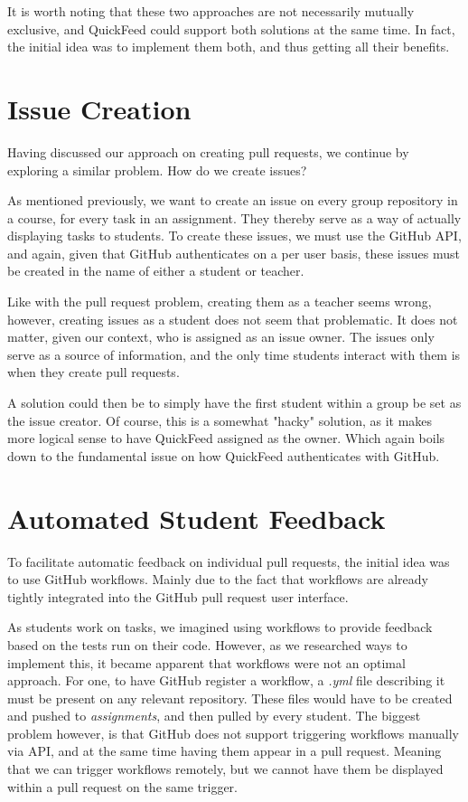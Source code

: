 It is worth noting that these two approaches are not necessarily mutually exclusive, and QuickFeed could support both solutions at the same time.
In fact, the initial idea was to implement them both, and thus getting all their benefits.

\section{Issue Creation}
\label{sec:issue-creation}

Having discussed our approach on creating pull requests, we continue by exploring a similar problem.
How do we create issues?

As mentioned previously, we want to create an issue on every group repository in a course, for every task in an assignment.
They thereby serve as a way of actually displaying tasks to students.
To create these issues, we must use the GitHub API, and again, given that GitHub authenticates on a per user basis, these issues must be created in the name of either a student or teacher.

Like with the pull request problem, creating them as a teacher seems wrong, however, creating issues as a student does not seem that problematic.
It does not matter, given our context, who is assigned as an issue owner.
The issues only serve as a source of information, and the only time students interact with them is when they create pull requests.

A solution could then be to simply have the first student within a group be set as the issue creator.
Of course, this is a somewhat "hacky" solution, as it makes more logical sense to have QuickFeed assigned as the owner.
Which again boils down to the fundamental issue on how QuickFeed authenticates with GitHub.

\section{Automated Student Feedback}

To facilitate automatic feedback on individual pull requests, the initial idea was to use GitHub workflows.
Mainly due to the fact that workflows are already tightly integrated into the GitHub pull request user interface.

As students work on tasks, we imagined using workflows to provide feedback based on the tests run on their code.
However, as we researched ways to implement this, it became apparent that workflows were not an optimal approach.
For one, to have GitHub register a workflow, a \textit{.yml} file describing it must be present on any relevant repository.
These files would have to be created and pushed to \textit{assignments}, and then pulled by every student.
The biggest problem however, is that GitHub does not support triggering workflows manually via API, and at the same time having them appear in a pull request.
Meaning that we can trigger workflows remotely, but we cannot have them be displayed within a pull request on the same trigger.

